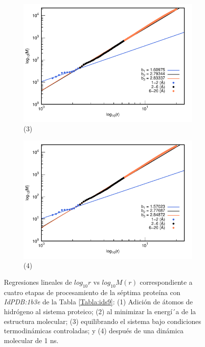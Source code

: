 \begin{figure}[H]
	\vspace{0cm} %
	
	\hspace{-0.3cm} 
	\begin{subfigure}{0.49\textwidth}
		\centering
		\includegraphics[width=\linewidth,page=1]{graphs/PDBs/1b3e/1b3eEq.pdf}
		\caption{(3)}
	\end{subfigure}
	\hspace{0.2cm}
	\begin{subfigure}{0.49\textwidth} %
		\centering
		\includegraphics[width=\linewidth,page=1]{graphs/PDBs/1b3e/1b3e1ns.pdf}
		\caption{(4)}
	\end{subfigure}
	\caption{Regresiones lineales de $log_{10}r$ vs $log_{10}M(r)$ correspondiente a cuatro etapas de procesamiento de la s\'{e}ptima prote\'{i}na con \textit{IdPDB:1b3e} de la Tabla \ref{Tabla:ids9}: (1) Adici\'{o}n de \'{a}tomos de hidr\'{o}geno al sistema proteico; (2) al minimizar la energ\'{i´}a de la estructura molecular; (3) equilibrando el sistema bajo condiciones termodin\'{a}micas controladas; y (4) despu\'{e}s de una din\'{a}mica molecular de 1 ns.}
	\label{fig:1b3e}
\end{figure}


